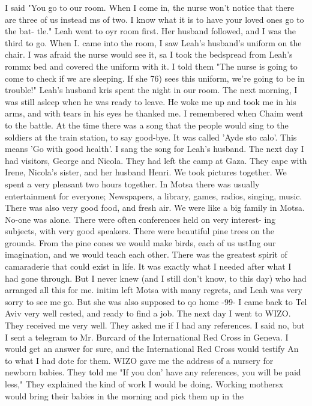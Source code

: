 {{I said "You go to our room.
When I come in, the nurse won't notice that there are 
three of us instead ms of two.
I know what it is to have your loved ones go to the bat-
tle."
Leah went to oyr room first.
Her husband followed, and I was the third to go.
When I. came into the room, I saw Leah's husband's uniform on the chair.
I was afraid the 
nurse would see it, sa I took the bedspread from Leah's rommx bed and covered the uniform 
with it.
I told them "The nurse is going to come to check if we are sleeping.
If she 
76) 
sees this uniform, we're going to be in trouble!"
Leah's husband kris spent the night in our room.
The next morning, I was still asleep 
when he was ready to leave.
He woke me up and took me in his arms, and with tears in his 
eyes he thanked me.
I remembered when Chaim went to the battle.
At the time there was 
a song that the people would sing to the soldiers at the train station, to say good-bye.
It was called 'Ayde sto calo'.
This means 'Go with good health'.
I sang the song for 
Leah's husband.
The next day I had visitors, George and Nicola.
They had left the camp at Gaza.
They 
cape with Irene, Nicola's sister, and her husband Henri.
We took pictures together.
We 
spent a very pleasant two hours together.
In Motsa there was usually entertainment for everyone; Newspapers, a library, games, 
radios, singing, music.
There was also very good food, and fresh air.
We were like a big 
family in Motsa.
No-one was alone.
There were often conferences held on very interest-
ing subjects, with very good speakers.
There were beautiful pine trees on the grounds.
From the pine cones we would make birds, each of us ustIng our imagination, and we would 
teach each other.
There was the greatest spirit of camaraderie that could exist in life.
It was exactly what I needed after what I had gone through.
But I never knew (and I still 
don't know, to this day) who had arranged all this for me.
initim left Motsa with many regrets, and Leah was very sorry to see me go.
But she 
was also supposed to qo home 
-99- 
I came back to Tel Aviv very well rested, and ready to find a job.
The next day I 
went to WIZO.
They received me very well.
They asked me if I had any references.
I 
said no, but I sent a telegram to Mr.
Burcard of the International Red Cross in Geneva.
I would get an answer for sure, and the International Red Cross would testify An to what 
I had dote for them.
WIZO gave me the address of a nursery for newborn babies.
They told me "If you don' 
have any references, you will be paid less," They explained the kind of work I would be 
doing.
Working mothersx would bring their babies in the morning and pick them up in the 
}}

